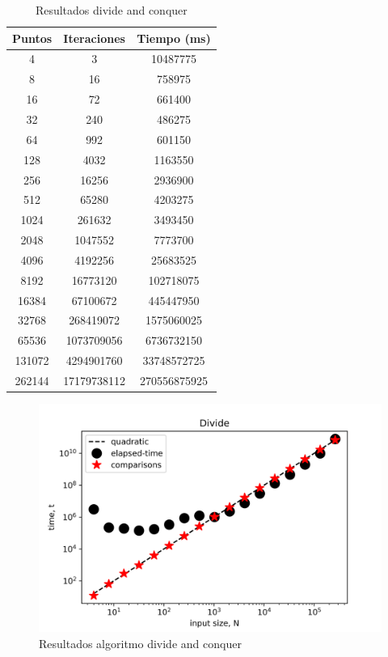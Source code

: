 \begin{table}[h!]
    \centering
    \begin{tabular}{|c|c|c|}
    \hline
    Puntos & Iteraciones & Tiempo (ms)\\
    \hline
    4 & 3 & 10487775\\
    \hline
    8 & 16 & 758975\\
    \hline
    16 & 72 & 661400\\
    \hline
    32 & 240 & 486275\\
    \hline
    64 & 992 & 601150\\
    \hline
    128 & 4032 & 1163550\\
    \hline
    256 & 16256 & 2936900\\
    \hline
    512 & 65280 & 4203275\\
    \hline
    1024 & 261632 & 3493450\\
    \hline
    2048 & 1047552 & 7773700\\
    \hline
    4096 & 4192256 & 25683525\\
    \hline
    8192 & 16773120 & 102718075\\
    \hline
    16384 & 67100672 & 445447950\\
    \hline
   32768 & 268419072 & 1575060025\\
    \hline
    65536 & 1073709056 & 6736732150\\
    \hline
    131072 & 4294901760 & 33748572725\\
    \hline
    262144 & 17179738112 & 270556875925\\
    \hline
    \end{tabular}
    \caption{Resultados divide and conquer}
    \label{tab:divideT}
\end{table}
\begin{figure}[h!]
    \centering
    \includegraphics[scale=0.8, center]{images/divide.png}
    \caption{Resultados algoritmo divide and conquer}
    \label{divG}
\end{figure}
\FloatBarrier